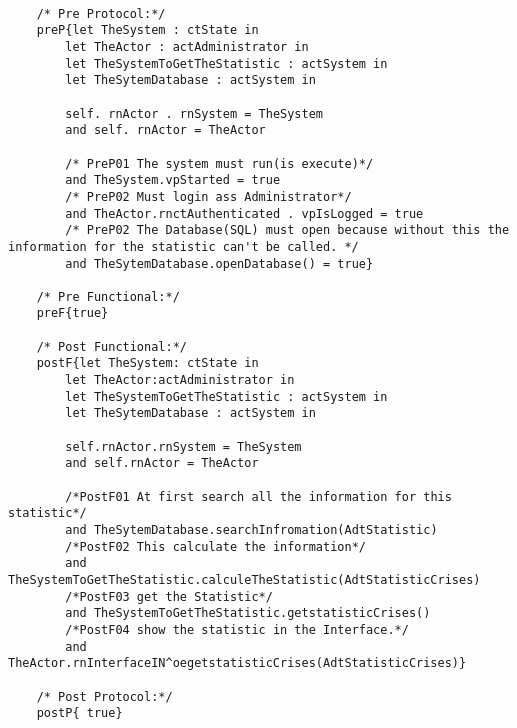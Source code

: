 	\scriptsize
	\vspace{0.5cm}
	\begin{lstlisting}[style=MessirStyle,firstnumber=auto,captionpos=b,caption={\msrmessir (MCL-oriented) specification of the operation \emph{oegetstatisticCrises}.},label=OM-actAdministrator-oegetstatisticCrises-MCL-LST]

	/* Pre Protocol:*/ 
	preP{let TheSystem : ctState in 
		let TheActor : actAdministrator in 
		let TheSystemToGetTheStatistic : actSystem in 
		let TheSytemDatabase : actSystem in 
		
		self. rnActor . rnSystem = TheSystem 
		and self. rnActor = TheActor
		
		/* PreP01 The system must run(is execute)*/
		and TheSystem.vpStarted = true
		/* PreP02 Must login ass Administrator*/
		and TheActor.rnctAuthenticated . vpIsLogged = true
		/* PreP02 The Database(SQL) must open because without this the information for the statistic can't be called. */
		and TheSytemDatabase.openDatabase() = true}
	
	/* Pre Functional:*/
	preF{true}
	
	/* Post Functional:*/ 
	postF{let TheSystem: ctState in
	    let TheActor:actAdministrator in
	    let TheSystemToGetTheStatistic : actSystem in
	    let TheSytemDatabase : actSystem in 
	    
		self.rnActor.rnSystem = TheSystem
	    and self.rnActor = TheActor
	    
	    /*PostF01 At first search all the information for this statistic*/
	    and TheSytemDatabase.searchInfromation(AdtStatistic)
	    /*PostF02 This calculate the information*/
	    and TheSystemToGetTheStatistic.calculeTheStatistic(AdtStatisticCrises)
	    /*PostF03 get the Statistic*/
	    and TheSystemToGetTheStatistic.getstatisticCrises()
	    /*PostF04 show the statistic in the Interface.*/
	   	and TheActor.rnInterfaceIN^oegetstatisticCrises(AdtStatisticCrises)}
	
	/* Post Protocol:*/ 
	postP{ true}
	
	\end{lstlisting}
	\normalsize 
	
	
	
	





